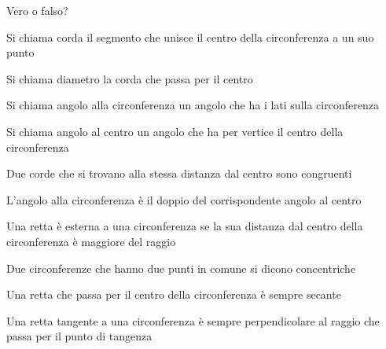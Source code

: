 \begin{esercizio}
\label{ese:5.5}
Vero o falso?
\begin{enumeratea}
\item Si chiama corda il segmento che unisce il centro della circonferenza a un suo punto\hfill\boxV\quad\boxF
\item Si chiama diametro la corda che passa per il centro\hfill\boxV\quad\boxF
\item Si chiama angolo alla circonferenza un angolo che ha i lati sulla circonferenza\hfill\boxV\quad\boxF
\item Si chiama angolo al centro un angolo che ha per vertice il centro della circonferenza\hfill\boxV\quad\boxF
\item Due corde che si trovano alla stessa distanza dal centro sono congruenti\hfill\boxV\quad\boxF
\item L’angolo alla circonferenza è il doppio del corrispondente angolo al centro\hfill\boxV\quad\boxF
\item Una retta è esterna a una circonferenza se la sua distanza dal centro della circonferenza è maggiore del raggio\hfill\boxV\quad\boxF
\item Due circonferenze che hanno due punti in comune si dicono concentriche\hfill\boxV\quad\boxF
\item Una retta che passa per il centro della circonferenza è sempre secante\hfill\boxV\quad\boxF
\item Una retta tangente a una circonferenza è sempre perpendicolare al raggio che passa per il punto di tangenza\hfill\boxV\quad\boxF
\end{enumeratea}
\end{esercizio}

